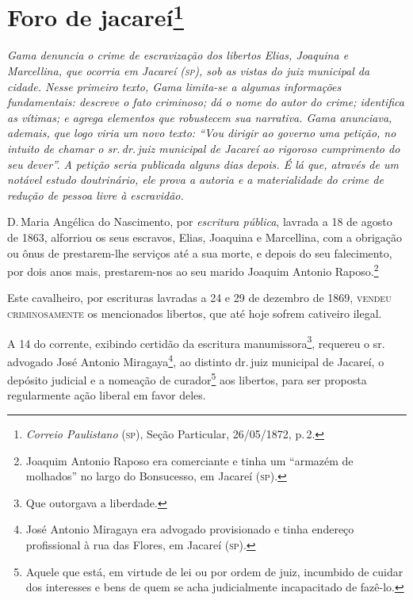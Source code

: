 \chapter{Foro de jacareí\footnote{\emph{Correio Paulistano} (\textsc{sp}), Seção Particular,
  26/05/1872, p.\,2.}} %

\begin{didascalia}
\emph{Gama denuncia o crime de escravização dos libertos Elias, Joaquina
e Marcellina, que ocorria em Jacareí (\textsc{sp}), sob as vistas do juiz
municipal da cidade. Nesse primeiro texto, Gama limita-se a algumas
informações fundamentais: descreve o fato criminoso; dá o nome do autor
do crime; identifica as vítimas; e agrega elementos que robustecem sua
narrativa. Gama anunciava, ademais, que logo viria um novo texto: ``Vou
dirigir ao governo uma petição, no intuito de chamar o sr.\,dr.\,juiz
municipal de Jacareí ao rigoroso cumprimento do seu dever''. A petição
seria publicada alguns dias depois. É lá que, através de um notável
estudo doutrinário, ele prova a autoria e a materialidade do crime de
redução de pessoa livre à escravidão.}
\end{didascalia}

D.\,Maria Angélica do Nascimento, por \emph{escritura pública}, lavrada a
18 de agosto de 1863, alforriou os seus escravos, Elias, Joaquina e
Marcellina, com a obrigação ou ônus de prestarem-lhe serviços até a sua
morte, e depois do seu falecimento, por dois anos mais, prestarem-nos ao
seu marido Joaquim Antonio Raposo.\footnote{ Joaquim Antonio Raposo era
  comerciante e tinha um ``armazém de molhados'' no largo do Bonsucesso,
  em Jacareí (\textsc{sp}).}

Este cavalheiro, por escrituras lavradas a 24 e 29 de dezembro de 1869,
\textsc{vendeu} \textsc{criminosamente} os mencionados libertos, que até hoje sofrem
cativeiro ilegal.

A 14 do corrente, exibindo certidão da escritura manumissora\footnote{
  Que outorgava a liberdade.}, requereu o sr.\,advogado José Antonio
Miragaya\footnote{ José Antonio Miragaya era advogado provisionado e
  tinha endereço profissional à rua das Flores, em Jacareí (\textsc{sp}).}, ao
distinto dr.\,juiz municipal de Jacareí, o depósito judicial e a nomeação
de curador\footnote{ Aquele que está, em virtude de lei ou por ordem de
  juiz, incumbido de cuidar dos interesses e bens de quem se acha
  judicialmente incapacitado de fazê-lo.} aos libertos, para ser
proposta regularmente ação liberal em favor deles.

